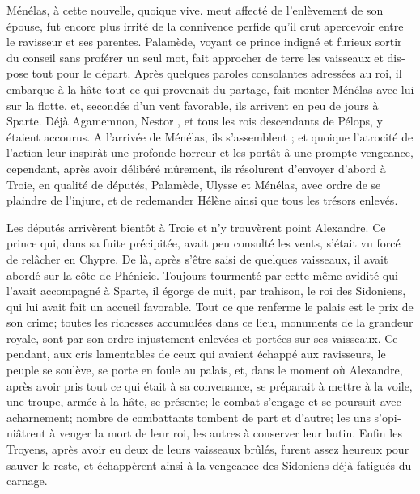 \documentclass{article}
\begin{document}
\begin{pages}
\begin{Leftside}
\begin{french}
Ménélas, à cette nouvelle, quoique vive. meut affecté de l'enlèvement de son épouse, fut encore plus irrité de la connivence perfide qu'il crut apercevoir entre le ravisseur et ses parentes. Palamède, voyant ce prince indigné et furieux sortir du conseil sans proférer un seul mot, fait approcher de terre les vaisseaux et dispose tout pour le départ. Après quelques paroles consolantes adressées au roi, il embarque à la hâte tout ce qui provenait du partage, fait monter Ménélas avec lui sur la flotte, et, secondés d'un vent favorable, ils arrivent en peu de jours à Sparte. Déjà Agamemnon, Nestor , et tous les rois descendants de Pélops, y étaient accourus. A l'arrivée de Ménélas, ils s'assemblent ; et quoique l'atrocité de l'action leur inspiràt une profonde horreur et les portât â une prompte vengeance, cependant, après avoir délibéré mûrement, ils résolurent d'envoyer d'abord à Troie, en qualité de députés, Palamède, Ulysse et Ménélas, avec ordre de se plaindre de l'injure, et de redemander Hélène ainsi que tous les trésors enlevés.

Les députés arrivèrent bientôt à Troie et n'y trouvèrent point Alexandre. Ce prince qui, dans sa fuite précipitée, avait peu consulté les vents, s'était vu forcé de relâcher en Chypre. De là, après s'être saisi de quelques vaisseaux, il avait abordé sur la côte de Phénicie. Toujours tourmenté par cette même avidité qui l'avait accompagné à Sparte, il égorge de nuit, par trahison, le roi des Sidoniens, qui lui avait fait un accueil favorable. Tout ce que renferme le palais est le prix de son crime; toutes les richesses accumulées dans ce lieu, monuments de la grandeur royale, sont par son ordre injustement enlevées et portées sur ses vaisseaux. Cependant, aux cris lamentables de ceux qui avaient échappé aux ravisseurs, le peuple se soulève, se porte en foule au palais, et, dans le moment où Alexandre, après avoir pris tout ce qui était à sa convenance, se préparait à mettre à la voile, une troupe, armée à la hâte, se présente; le combat s'engage et se poursuit avec acharnement; nombre de combattants tombent de part et d'autre; les uns s'opiniâtrent à venger la mort de leur roi, les autres à conserver leur butin. Enfin les Troyens, après avoir eu deux de leurs vaisseaux brûlés, furent assez heureux pour sauver le reste, et échappèrent ainsi à la vengeance des Sidoniens déjà fatigués du carnage.

\endnumbering
\end{french}
\end{Leftside}


\end{pages}
\end{document}

